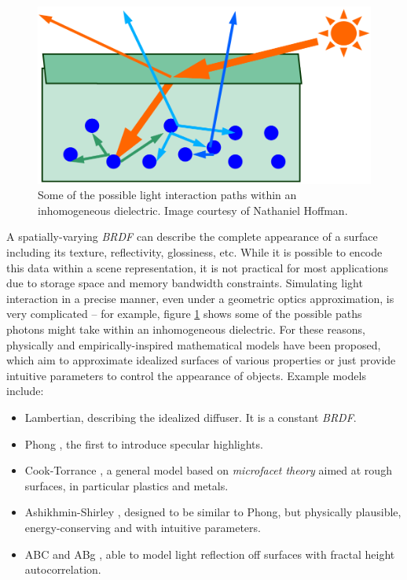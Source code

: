 \begin{figure}[h!]
  \centering
    \includegraphics[width=0.4\linewidth]{./Chapters/InhomogeneousDielectric.png}
    \caption[Inhomogeneous dielectric]{Some of the possible light interaction paths within an inhomogeneous dielectric. Image courtesy of Nathaniel Hoffman.}
  \label{fig:InhomogeneousDielectric}
\end{figure}

A spatially-varying \emph{BRDF} can describe the complete appearance of a surface including its texture, reflectivity, glossiness, etc. While it is possible to encode this data within a scene representation, it is not practical for most applications due to storage space and memory bandwidth constraints. Simulating light interaction in a precise manner, even under a geometric optics approximation, is very complicated -- for example, figure \ref{fig:InhomogeneousDielectric} shows some of the possible paths photons might take within an inhomogeneous dielectric. For these reasons, physically and empirically-inspired mathematical models have been proposed, which aim to approximate idealized surfaces of various properties or just provide intuitive parameters to control the appearance of objects. Example models include:
\begin{itemize}
\item Lambertian, describing the idealized diffuser. It is a constant \emph{BRDF}.
\item Phong \cite{Phong}, the first to introduce specular highlights.
\item Cook-Torrance \cite{CookTorrance}, a general model based on \emph{microfacet theory} aimed at rough surfaces, in particular plastics and metals.
\item Ashikhmin-Shirley \cite{Ashikhmin00ananisotropic}, designed to be similar to Phong, but physically plausible, energy-conserving and with intuitive parameters.
\item ABC and ABg \cite{opticalScattering}, able to model light reflection off surfaces with fractal height autocorrelation.
\end{itemize}

